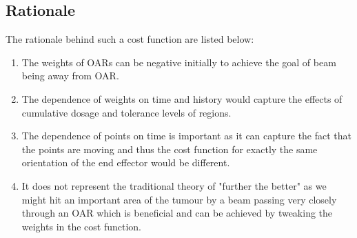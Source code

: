 \documentclass[10pt]{report}
\begin{document}
\subsection{Rationale}
The rationale behind such a cost function are listed below:
\begin{enumerate}
\item The weights of OARs can be negative initially to achieve the goal of beam being away from OAR.
\item The dependence of weights on time and history would capture the effects of cumulative dosage and tolerance levels of regions.
\item The dependence of points on time is important as it can capture the fact that the points are moving and thus the cost function for exactly the same orientation of the end effector would be different.
\item It does not represent the traditional theory of "further the better" as we might hit an important area of the tumour by a beam passing very closely through an OAR which is beneficial and can be achieved by tweaking the weights in the cost function.
\end{enumerate}
\end{document}
